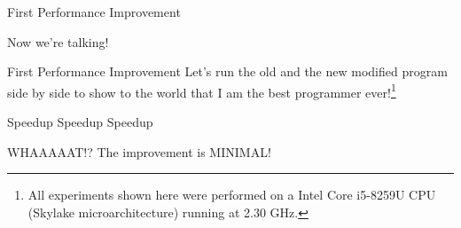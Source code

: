 \begin{frame}{First Performance Improvement}
\begin{block}{Now we're talking!}
\end{block}
\end{frame}


\begin{frame}{First Performance Improvement}
Let's run the old and the new modified program side by side to show to the world that I am the best programmer ever!\footnote{All experiments shown here were performed on a Intel Core i5-8259U CPU (Skylake microarchitecture) running at 2.30 GHz.}
\begin{block}{Speedup Speedup Speedup}
\end{block}
\pause
\alert{\centering WHAAAAAT!? The improvement is MINIMAL!\\}
\end{frame}


